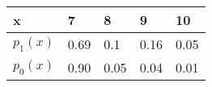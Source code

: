 \begin{tabular}{|p{1cm}|p{1cm}|p{1cm}|p{1cm}|p{1cm}|}
\hline
x & 7 & 8 & 9 & 10 \\
\hline
$p_1(x)$ & 0.69 & 0.1 & 0.16 & 0.05 \\
\hline
$p_0(x)$ & 0.90 & 0.05 & 0.04 & 0.01\\
\hline
\end{tabular} 